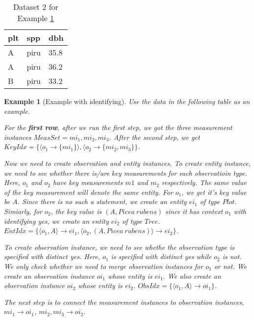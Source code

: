 \documentclass[10pt]{article}
\newtheorem{example}{Example}[section]
\begin{document}
\begin{table}[htb]
\begin{center}
\begin{tabular}{|l|l|l|}
\hline
plt & spp & dbh\\\hline
A & piru & 35.8 \\\hline
A & piru & 36.2 \\\hline
B & piru &33.2 \\\hline
\end{tabular}
\end{center}
\vspace{-0.2in}
\caption{Dataset 2 for Example \ref{eg2}}
\end{table}

\begin{example} [Example with identifying]\label{eg2}
Use the data in the following table as an example. 

For the {\bf first row}, after we run the first step, we got the three measurement instances $MeasSet=mi_1, mi_2, mi_3$. 
After the second step, we get $KeyIdx = \{\langle o_1\rightarrow \{mi_1\} \rangle, \langle o_2 \rightarrow \{mi_2, mi_3\}\}$.

Now we need to create observation and entity instances. 
To create entity instance, we need to see whether there is/are key measurements for each observatioin type.  
Here,  $o_1$ and $o_2$ have key measurements $m1$ and $m_2$ respectively. 
The same value of the key measurement will denote the same entity. 
For $o_1$, we get it's key value be $A$. Since there is no such a statement, we create an entity $ei_1$ of type $Plot$.
Simiarly, for $o_2$, the key value is $(A, Picea~rubens)$ since it has context $o_1$ with {\em identifying yes}, we create an entity $ei_2$ of type $Tree$. \\
$EntIdx = \{\langle o_1, A\rangle \rightarrow ei_1, \langle o_2, (A, Picea~rubens) \rangle \rightarrow ei_2\}$. 

To create observation instance, we need to see whethe the observation type is specified with distinct yes. 
Here, $o_1$ is specified with {\em distinct yes} while $o_2$ is not. 
We only check whether we need to merge observation instances for $o_1$ or not. 
We create an observation instance $oi_1$ whose entity is $ei_1$. 
We also create an observation instance $oi_2$ whose entity is $ei_2$. 
$ObsIdx = \{\langle o_1, A\rangle \rightarrow oi_1\}$. 

The next step is to connect the measurement instances to observation instances,  $mi_1 \rightarrow oi_1$, $mi_2, mi_3 \rightarrow oi_2$.


\end{example}
\end{document}
